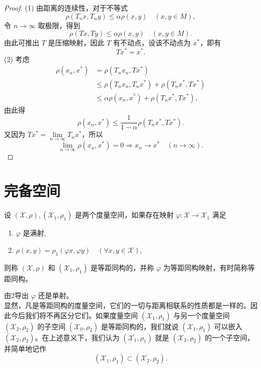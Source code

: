 \documentclass[lang=cn,newtx,10pt,scheme=chinese,thmcnt=chapter]{elegantbook}
\begin{document}
\begin{proof}
(1) 由距离的连续性，对于不等式
\[
\rho\left(T_n x, T_n y\right) \leqslant \alpha \rho(x, y) \quad (x, y \in M),
\]
令 \( n \to \infty \) 取极限，得到
\[
\rho(T x, T y) \leqslant \alpha \rho(x, y) \quad (x, y \in M).
\]
由此可推出 \( T \) 是压缩映射，因此 \( T \) 有不动点，设该不动点为 \( x^* \)，即有
\[
T x^* = x^*.
\]
(2) 考虑
\[
\begin{aligned}
\rho\left(x_n, x^*\right) &= \rho\left(T_n x_n, T x^*\right) \\
&\leqslant \rho\left(T_n x_n, T_n x^*\right) + \rho\left(T_n x^*, T x^*\right) \\
&\leqslant \alpha \rho\left(x_n, x^*\right) + \rho\left(T_n x^*, T x^*\right),
\end{aligned}
\]
由此得
\[
\rho\left(x_n, x^*\right) \leqslant \frac{1}{1-\alpha} \rho\left(T_n x^*, T x^*\right).
\]
又因为 \( T x^* = \lim\limits_{n \to \infty} T_n x^* \)，所以
\[
\lim_{n \to \infty} \rho\left(x_n, x^*\right) = 0 \Longrightarrow x_n \to x^* \quad (n \to \infty).
\]
\end{proof}

\section{完备空间}
\begin{definition} 设 \( (\mathscr{X}, \rho),\left( \mathscr{X}_1, \rho_1\right) \) 是两个度量空间，如果存在映射 \( \varphi: \mathscr{X} \rightarrow \mathscr{X}_1 \) 满足
\begin{enumerate}
\item \( \varphi \) 是满射,
\item \( \rho(x, y) = \rho_1(\varphi x, \varphi y) \quad(\forall x, y \in \mathscr{X}) \),
\end{enumerate}
则称 \( (\mathscr{X}, \rho) \) 和 \( \left( \mathscr{X}_1, \rho_1\right) \) 是等距同构的，并称 \( \varphi \) 为等距同构映射，有时简称等距同构。


\end{definition}
\begin{note}
由2导出 \( \varphi \) 还是单射。\\
显然，凡是等距同构的度量空间，它们的一切与距离相联系的性质都是一样的。因此今后我们将不再区分它们。如果度量空间 \( \left( \mathscr{X}_1, \rho_1\right) \) 与另一个度量空间 \( \left( \mathscr{X}_2, \rho_2\right) \) 的子空间 \( \left( \mathscr{X}_0, \rho_2\right) \) 是等距同构的，我们就说 \( \left( \mathscr{X}_1, \rho_1\right) \) 可以嵌入 \( \left( \mathscr{X}_2, \rho_2\right) \)。在上述意义下，我们认为 \( \left( \mathscr{X}_1, \rho_1\right) \) 就是 \( \left( \mathscr{X}_2, \rho_2\right) \) 的一个子空间，并简单地记作
\begin{equation*}
\left( \mathscr{X}_1, \rho_1\right) \subset \left( \mathscr{X}_2, \rho_2\right).
\end{equation*}
\end{note}
\end{document}
